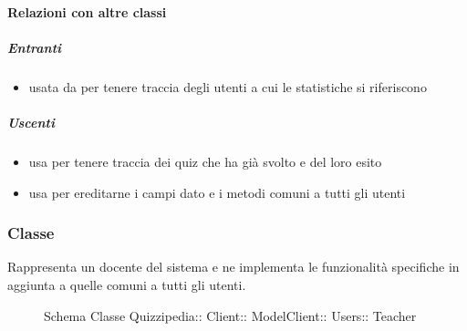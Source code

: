 \paragraph{Relazioni con altre classi}
\subparagraph{Entranti}
\begin{itemize}
\item usata da  per tenere traccia degli utenti a cui le statistiche si riferiscono
\end{itemize}
\subparagraph{Uscenti}
\begin{itemize}
\item usa  per tenere traccia dei quiz che ha già svolto e del loro esito
\item usa  per ereditarne i campi dato e i metodi comuni a tutti gli utenti
\end{itemize}
\subsubsection{Classe }
Rappresenta un docente del sistema e ne implementa le funzionalità specifiche in aggiunta a quelle comuni a tutti gli utenti.
\begin{figure}[H]
\centering
\noindent{}
\caption[Schema Classe Teacher]{Schema Classe Quizzipedia:: Client:: ModelClient:: Users:: Teacher}
\end{figure}

